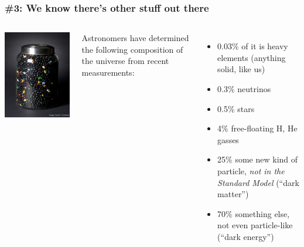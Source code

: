\documentclass[compress]{beamer}
\begin{document}
\begin{frame}
\frametitle{\#3: We know there's other stuff out there}
\begin{columns}
\includegraphics[width=\linewidth]{darkmatter.jpg}

Astronomers have determined the following composition of the universe from recent measurements:
\begin{itemize}
\item 0.03\% of it is heavy elements (anything solid, like us)
\item 0.3\% neutrinos
\item 0.5\% stars
\item 4\% free-floating H, He gasses
\item 25\% some new kind of particle, {\it not in the Standard Model} (``dark matter'')
\item 70\% something else, not even particle-like (``dark energy'')
\end{itemize}
\end{columns}
\end{frame}
\end{document}
